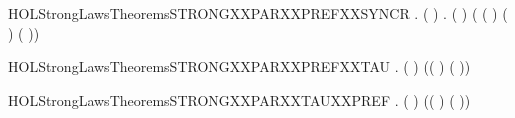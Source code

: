 \newcommand{\HOLStrongLawsTheoremsSTRONGXXPARXXPREFXXNOXXSYNCR}{\UseVerbatim{HOLStrongLawsTheoremsSTRONGXXPARXXPREFXXNOXXSYNCR}}
\begin{SaveVerbatim}{HOLStrongLawsTheoremsSTRONGXXPARXXPREFXXSYNCR}
\HOLTokenTurnstile{} \HOLSymConst{\HOLTokenForall{}} .
       ( \HOLSymConst{=}  ) \HOLSymConst{\HOLTokenImp{}}
       \HOLSymConst{\HOLTokenForall{}} .
            (  \HOLSymConst{\ensuremath{\parallel}}  )
             ( ( \HOLSymConst{\ensuremath{\parallel}}  ) \HOLSymConst{+}
               (  \HOLSymConst{\ensuremath{\parallel}} ) \HOLSymConst{+} \HOLConst{\ensuremath{\tau}}( \HOLSymConst{\ensuremath{\parallel}} ))
\end{SaveVerbatim}
\newcommand{\HOLStrongLawsTheoremsSTRONGXXPARXXPREFXXSYNCR}{\UseVerbatim{HOLStrongLawsTheoremsSTRONGXXPARXXPREFXXSYNCR}}
\begin{SaveVerbatim}{HOLStrongLawsTheoremsSTRONGXXPARXXPREFXXTAU}
\HOLTokenTurnstile{} \HOLSymConst{\HOLTokenForall{}}  .
        ( \HOLSymConst{\ensuremath{\parallel}} \HOLConst{\ensuremath{\tau}})
         (( \HOLSymConst{\ensuremath{\parallel}} \HOLConst{\ensuremath{\tau}}) \HOLSymConst{+} \HOLConst{\ensuremath{\tau}}( \HOLSymConst{\ensuremath{\parallel}} ))
\end{SaveVerbatim}
\newcommand{\HOLStrongLawsTheoremsSTRONGXXPARXXPREFXXTAU}{\UseVerbatim{HOLStrongLawsTheoremsSTRONGXXPARXXPREFXXTAU}}
\begin{SaveVerbatim}{HOLStrongLawsTheoremsSTRONGXXPARXXTAUXXPREF}
\HOLTokenTurnstile{} \HOLSymConst{\HOLTokenForall{}}  .
        (\HOLConst{\ensuremath{\tau}} \HOLSymConst{\ensuremath{\parallel}} )
         (\HOLConst{\ensuremath{\tau}}( \HOLSymConst{\ensuremath{\parallel}} ) \HOLSymConst{+} (\HOLConst{\ensuremath{\tau}} \HOLSymConst{\ensuremath{\parallel}} ))
\end{SaveVerbatim}
